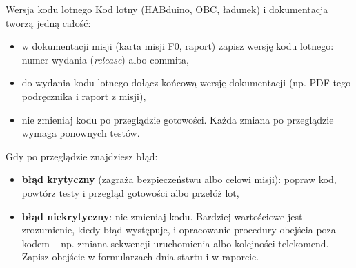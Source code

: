 \begin{sekcja}{Wersja kodu lotnego}
Kod lotny (HABduino, OBC, ładunek) i dokumentacja tworzą jedną całość:
\begin{itemize}
  \item w dokumentacji misji (karta misji F0, raport) zapisz wersję kodu lotnego: numer wydania (\emph{release}) albo commita,
  \item do wydania kodu lotnego dołącz końcową wersję dokumentacji (np. PDF tego podręcznika i raport z misji),
  \item nie zmieniaj kodu po przeglądzie gotowości. Każda zmiana po przeglądzie wymaga ponownych testów.
\end{itemize}

Gdy po przeglądzie znajdziesz błąd:
\begin{itemize}
  \item \textbf{błąd krytyczny} (zagraża bezpieczeństwu albo celowi misji): popraw kod, powtórz testy i przegląd gotowości albo przełóż lot,
  \item \textbf{błąd niekrytyczny}: nie zmieniaj kodu. Bardziej wartościowe jest zrozumienie, kiedy błąd występuje, i opracowanie procedury obejścia poza kodem -- np. zmiana sekwencji uruchomienia albo kolejności telekomend. Zapisz obejście w formularzach dnia startu i w raporcie.
\end{itemize}
\end{sekcja}

